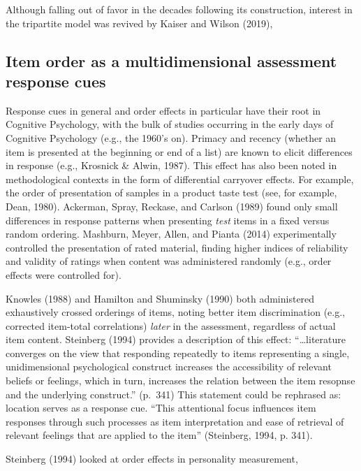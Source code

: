 \documentclass[
  english,
  man]{apa6}
\begin{document}
Although falling out of favor in the decades following its construction, interest in the tripartite model was revived by Kaiser and Wilson (2019),

\hypertarget{item-order-as-a-multidimensional-assessment-response-cues}{%
\subsection{Item order as a multidimensional assessment response cues}\label{item-order-as-a-multidimensional-assessment-response-cues}}

Response cues in general and order effects in particular have their root in Cognitive Psychology, with the bulk of studies occurring in the early days of Cognitive Psychology (e.g., the 1960's on). Primacy and recency (whether an item is presented at the beginning or end of a list) are known to elicit differences in response (e.g., Krosnick \& Alwin, 1987). This effect has also been noted in methodological contexts in the form of differential carryover effects. For example, the order of presentation of samples in a product taste test (see, for example, Dean, 1980). Ackerman, Spray, Reckase, and Carlson (1989) found only small differences in response patterns when presenting \emph{test} items in a fixed versus random ordering. Mashburn, Meyer, Allen, and Pianta (2014) experimentally controlled the presentation of rated material, finding higher indices of reliability and validity of ratings when content was administered randomly (e.g., order effects were controlled for).

Knowles (1988) and Hamilton and Shuminsky (1990) both administered exhaustively crossed orderings of items, noting better item discrimination (e.g., corrected item-total correlations) \emph{later} in the assessment, regardless of actual item content. Steinberg (1994) provides a description of this effect: \enquote{\ldots literature converges on the view that responding repeatedly to items representing a single, unidimensional psychological construct increases the accessibility of relevant beliefs or feelings, which in turn, increases the relation between the item resopnse and the underlying construct.} (p.~341) This statement could be rephrased as: location serves as a response cue. \enquote{This attentional focus influences item responses through such processes as item interpretation and ease of retrieval of relevant feelings that are applied to the item} (Steinberg, 1994, p. 341).

Steinberg (1994) looked at order effects in personality measurement,
\end{document}
